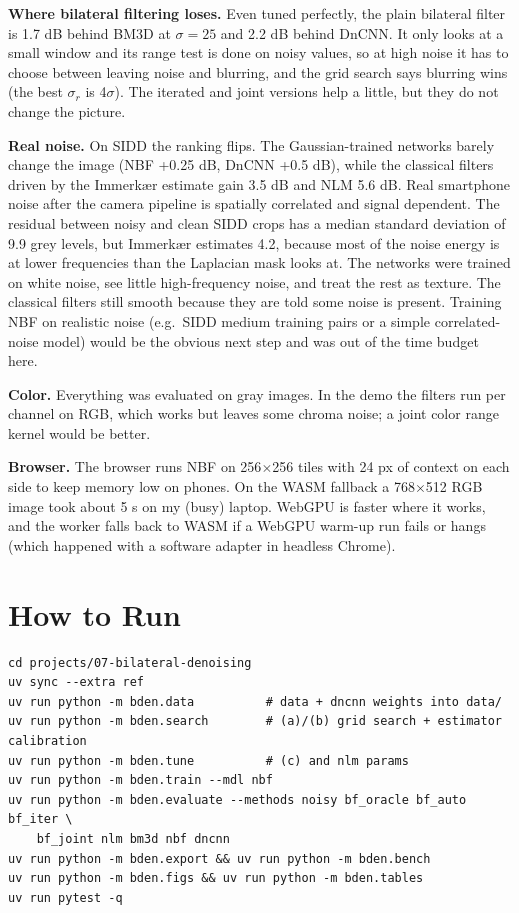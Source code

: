 \documentclass[11pt,a4paper]{article}
\begin{document}
\textbf{Where bilateral filtering loses.} Even tuned perfectly, the plain bilateral filter is 1.7 dB
behind BM3D at $\sigma=25$ and 2.2 dB behind DnCNN. It only looks at a small window and its range test is
done on noisy values, so at high noise it has to choose between leaving noise and blurring, and the
grid search says blurring wins (the best $\sigma_r$ is 4$\sigma$). The iterated and joint versions help a
little, but they do not change the picture.

\textbf{Real noise.} On SIDD the ranking flips. The Gaussian-trained networks barely change the image
(NBF +0.25 dB, DnCNN +0.5 dB), while the classical filters driven by the Immerk\ae r estimate gain 3.5 dB
and NLM 5.6 dB. Real smartphone noise after the camera pipeline is spatially correlated and signal
dependent. The residual between noisy and clean SIDD crops has a median standard deviation of 9.9 grey
levels, but Immerk\ae r estimates 4.2, because most of the noise energy is at lower frequencies than the
Laplacian mask looks at. The networks were trained on white noise, see little high-frequency noise, and
treat the rest as texture. The classical filters still smooth because they are told some noise is
present. Training NBF on realistic noise (e.g.\ SIDD medium training pairs or a simple
correlated-noise model) would be the obvious next step and was out of the time budget here.

\textbf{Color.} Everything was evaluated on gray images. In the demo the filters run per channel on
RGB, which works but leaves some chroma noise; a joint color range kernel would be better.

\textbf{Browser.} The browser runs NBF on 256$\times$256 tiles with 24 px of context on each side to keep
memory low on phones. On the WASM fallback a 768$\times$512 RGB image took about 5 s on my (busy) laptop.
WebGPU is faster where it works, and the worker falls back to WASM if a WebGPU warm-up run fails or hangs
(which happened with a software adapter in headless Chrome).

\section{How to Run}

\begin{verbatim}
cd projects/07-bilateral-denoising
uv sync --extra ref
uv run python -m bden.data          # data + dncnn weights into data/
uv run python -m bden.search        # (a)/(b) grid search + estimator calibration
uv run python -m bden.tune          # (c) and nlm params
uv run python -m bden.train --mdl nbf
uv run python -m bden.evaluate --methods noisy bf_oracle bf_auto bf_iter \
    bf_joint nlm bm3d nbf dncnn
uv run python -m bden.export && uv run python -m bden.bench
uv run python -m bden.figs && uv run python -m bden.tables
uv run pytest -q
\end{verbatim}
\end{document}
